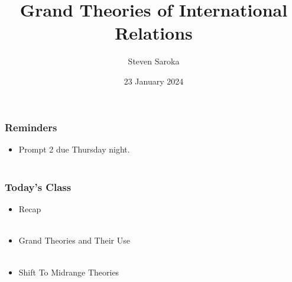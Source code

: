\documentclass{beamer}
\title[Grand Theories]{\LARGE{Grand Theories of International Relations}}
\author[POLI 150]{Steven Saroka}
\institute{POLI 150}
\date{23 January 2024}
\begin{document}
\begin{frame}
\titlepage %
\end{frame}










\begin{frame} 
	\frametitle{\LARGE{Reminders}}
	\begin{itemize}
		\item Prompt 2 due Thursday night. 
		\\~\\ 
	\end{itemize}
\end{frame}

\begin{frame} 
	\frametitle{\LARGE{Today's Class}}
	\begin{itemize}
		\item Recap
		\\~\\ 
		\item Grand Theories and Their Use
		\\~\\ 
		\item Shift To Midrange Theories
		\\~\\ 
	\end{itemize}
\end{frame}
\end{document}
